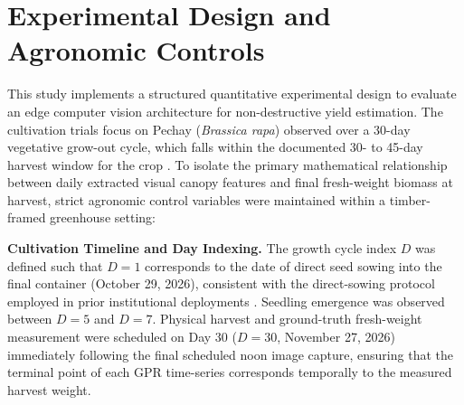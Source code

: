 \ifpdf
    \graphicspath{{Chapter3/Figs/Raster/}{Chapter3/Figs/PDF/}{Chapter3/Figs/}}
\else
    \graphicspath{{Chapter3/Figs/Vector/}{Chapter3/Figs/}}
\fi

\section{Experimental Design and Agronomic Controls}

This study implements a structured quantitative experimental design to evaluate an edge computer vision architecture for non-destructive yield estimation. The cultivation trials focus on Pechay (\textit{Brassica rapa}) observed over a 30-day vegetative grow-out cycle, which falls within the documented 30- to 45-day harvest window for the crop \cite{Camariosa2021}. To isolate the primary mathematical relationship between daily extracted visual canopy features and final fresh-weight biomass at harvest, strict agronomic control variables were maintained within a timber-framed greenhouse setting:

\textbf{Cultivation Timeline and Day Indexing.} The growth cycle index $D$ was defined such that $D = 1$ corresponds to the date of direct seed sowing into the final container (October 29, 2026), consistent with the direct-sowing protocol employed in prior institutional deployments \cite{ZamoraOgue2025}. Seedling emergence was observed between $D = 5$ and $D = 7$. Physical harvest and ground-truth fresh-weight measurement were scheduled on Day 30 ($D = 30$, November 27, 2026) immediately following the final scheduled noon image capture, ensuring that the terminal point of each GPR time-series corresponds temporally to the measured harvest weight.

